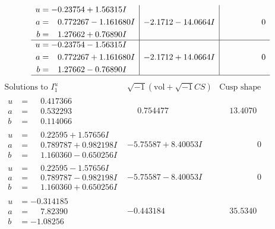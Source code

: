 \documentclass[1p]{elsarticle_modified}
\theoremstyle{definition}
\newcommand{\I}{\sqrt{-1}}
\begin{document}
$$\begin{array}{c|c|c}
\begin{aligned}
u &= -0.23754 + 1.56315 I \\
a &= \phantom{-}0.772267 - 1.161680 I \\
b &= \phantom{-}1.27662 + 0.76890 I\end{aligned}
 & -2.1712 - 14.0664 I & \phantom{-0.000000 } 0 \\ \hline\begin{aligned}
u &= -0.23754 - 1.56315 I \\
a &= \phantom{-}0.772267 + 1.161680 I \\
b &= \phantom{-}1.27662 - 0.76890 I\end{aligned}
 & -2.1712 + 14.0664 I & \phantom{-0.000000 } 0\\
 \hline 
 \end{array}$$\newpage$$\begin{array}{c|c|c}  
\text{Solutions to }I^u_{1}& \I (\text{vol} + \sqrt{-1}CS) & \text{Cusp shape}\\
 \hline 
\begin{aligned}
u &= \phantom{-}0.417366\phantom{ +0.000000I} \\
a &= \phantom{-}0.532293\phantom{ +0.000000I} \\
b &= \phantom{-}0.114066\phantom{ +0.000000I}\end{aligned}
 & \phantom{-}0.754477\phantom{ +0.000000I} & \phantom{-}13.4070\phantom{ +0.000000I} \\ \hline\begin{aligned}
u &= \phantom{-}0.22595 + 1.57656 I \\
a &= \phantom{-}0.789787 + 0.982198 I \\
b &= \phantom{-}1.160360 - 0.650256 I\end{aligned}
 & -5.75587 + 8.40053 I & \phantom{-0.000000 } 0 \\ \hline\begin{aligned}
u &= \phantom{-}0.22595 - 1.57656 I \\
a &= \phantom{-}0.789787 - 0.982198 I \\
b &= \phantom{-}1.160360 + 0.650256 I\end{aligned}
 & -5.75587 - 8.40053 I & \phantom{-0.000000 } 0 \\ \hline\begin{aligned}
u &= -0.314185\phantom{ +0.000000I} \\
a &= \phantom{-}7.82390\phantom{ +0.000000I} \\
b &= -1.08256\phantom{ +0.000000I}\end{aligned}
 & -0.443184\phantom{ +0.000000I} & \phantom{-}35.5340\phantom{ +0.000000I} \\ \hline\begin{aligned}

\end{aligned}
\end{array}$$
\end{document}
